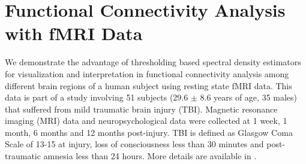 \section{Functional Connectivity Analysis with fMRI Data}\label{sec:realdata}


We demonstrate the advantage of thresholding based spectral density estimators for visualization and interpretation in functional connectivity analysis among different brain regions of a human subject using resting state fMRI data. This data is part of a study involving 51 subjects (29.6 $\pm$ 8.6 years of age, 35 males) that suffered from mild traumatic brain injury (TBI). Magnetic resonance imaging (MRI) data and neuropsychological data were collected at 1 week, 1 month, 6 months and 12 months post-injury. TBI is defined as Glasgow Coma Scale of 13-15 at injury, loss of consciousness less than 30 minutes and post-traumatic amnesia less than 24 hours. More  details are available in  \cite{Kuceyeski2018functional}. 


